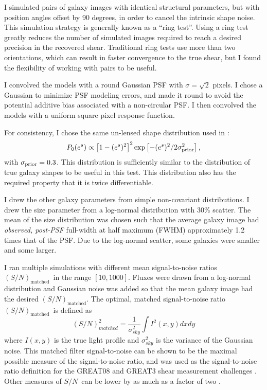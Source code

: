 \documentclass[usegraphicx,usenatbib]{mn2e}
\newcommand{\sn}{$S/N$}
\newcommand{\Msn}{$(S/N)_{\textrm{matched}}$}
\newcommand{\lognormscatt}{30}
\begin{document}
I simulated pairs of galaxy images with identical structural parameters, but
with position angles offset by 90 degrees, in order to cancel the intrinsic
shape noise.  This simulation strategy is generally known as a ``ring
test''\citep{Nakajima2007}.  Using a ring test greatly reduces the number of
simulated images required to reach a desired precision in the recovered shear.
Traditional ring tests use more than two orientations, which can result in
faster convergence to the true shear, but I found the flexibility of working
with pairs to be useful.  

I convolved the models with a round Gaussian PSF with $\sigma = \sqrt{2}$
pixels.  I chose a Gaussian to minimize PSF modeling errors, and made it round
to avoid the potential additive bias associated with a non-circular PSF.  I
then convolved the models with a uniform square pixel response function.

For consistency, I chose the same un-lensed shape distribution
used in \cite{ba14}:
\begin{equation}
P_0(e^s)\propto \left[1-(e^s)^2\right]^2 \exp\left[-(e^s)^2/2\sigma_{\rm prior}^2\right],
\end{equation}
with $\sigma_{\rm prior}=0.3$. This distribution is sufficiently similar to the
distribution of true galaxy shapes to be useful in this test.  This
distribution also has the required property that it is twice differentiable.

I drew the other galaxy parameters from simple non-covariant distributions.  I
drew the size parameter from a log-normal distribution with \lognormscatt\%
scatter.  The mean of the size distribution was chosen such that the average
galaxy image had {\em observed, post-PSF} full-width at half maximum (FWHM)
approximately 1.2 times that of the PSF.  Due to the log-normal scatter, some
galaxies were smaller and some larger.

I ran multiple simulations with different mean signal-to-noise ratios \Msn\ in the
range $[10,1000]$.  Fluxes were drawn from a log-normal distribution and
Gaussian noise was added so that the mean galaxy image had the desired 
\Msn.  The optimal, matched signal-to-noise ratio \Msn\ is defined as
\begin{equation}
    (S/N)^2_{matched} = \frac{1}{\sigma^2_{sky}} \int I^2(x,y) dx dy
\end{equation}
where $I(x,y)$ is the true light profile and $\sigma_{sky}^2$ is the variance
of the Gaussian noise.  This matched filter signal-to-noise can be shown to be
the maximal possible measure of the signal-to-noise ratio, and was used as the
signal-to-noise ratio definition for the GREAT08 and GREAT3 shear measurement
challenges \citep{BridleGREAT08,great3}.  Other measures of \sn\ can be lower
by as much as a factor of two \citep{great3}.
\end{document}
